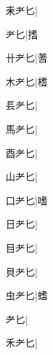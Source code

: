 \begin{multicols}{2}
{{\cjk{}耒耂匕}\mktsJzrVerticalBar{}{\cjk{}{\cnsym{}　}{\cnsym{}　}{\cnsym{}　}}|{}\par
{耂匕}\mktsJzrVerticalBar{}{\cjk{}{\cnsym{}　}{\cnsym{}　}{\cnsym{}　}}|{\cjk{}搘}\par
{\cjk{}卄耂匕}\mktsJzrVerticalBar{}{\cjk{}{\cnsym{}　}{\cnsym{}　}{\cnsym{}　}}|{\cjk{}蓍}\par
{\cjk{}木耂匕}\mktsJzrVerticalBar{}{\cjk{}{\cnsym{}　}{\cnsym{}　}{\cnsym{}　}}|{\cjk{}榰}\par
{\cjk{}镸耂匕}\mktsJzrVerticalBar{}{\cjk{}{\cnsym{}　}{\cnsym{}　}{\cnsym{}　}}|{}\par
{\cjk{}馬耂匕}\mktsJzrVerticalBar{}{\cjk{}{\cnsym{}　}{\cnsym{}　}{\cnsym{}　}}|{}\par
{\cjk{}酉耂匕}\mktsJzrVerticalBar{}{\cjk{}{\cnsym{}　}{\cnsym{}　}{\cnsym{}　}}|{}\par
{\cjk{}山耂匕}\mktsJzrVerticalBar{}{\cjk{}{\cnsym{}　}{\cnsym{}　}{\cnsym{}　}}|{}\par
{\cjk{}口耂匕}\mktsJzrVerticalBar{}{\cjk{}{\cnsym{}　}{\cnsym{}　}{\cnsym{}　}}|{\cjk{}嗜}\par
{\cjk{}日耂匕}\mktsJzrVerticalBar{}{\cjk{}{\cnsym{}　}{\cnsym{}　}{\cnsym{}　}}|{}\par
{\cjk{}目耂匕}\mktsJzrVerticalBar{}{\cjk{}{\cnsym{}　}{\cnsym{}　}{\cnsym{}　}}|{}\par
{\cjk{}貝耂匕}\mktsJzrVerticalBar{}{\cjk{}{\cnsym{}　}{\cnsym{}　}{\cnsym{}　}}|{}\par
{\cjk{}虫耂匕}\mktsJzrVerticalBar{}{\cjk{}{\cnsym{}　}{\cnsym{}　}{\cnsym{}　}}|{\cjk{}螧}\par
{耂匕}\mktsJzrVerticalBar{}{\cjk{}{\cnsym{}　}{\cnsym{}　}{\cnsym{}　}}|{}\par
{\cjk{}禾耂匕}\mktsJzrVerticalBar{}{\cjk{}{\cnsym{}　}{\cnsym{}　}{\cnsym{}　}}|{}\par
}
\end{multicols}

